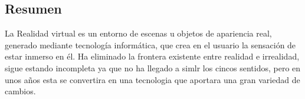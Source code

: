 \documentclass{bmcart}
\begin{document}
\begin{frontmatter}
\begin{abstractbox}

\begin{abstract} 

\end{abstract}



\section*{Resumen}
La Realidad virtual es un entorno de escenas u objetos de
apariencia real, generado mediante tecnología informática, que crea en el usuario la sensación de estar inmerso en él. Ha eliminado la frontera existente entre realidad e irrealidad, sigue estando incompleta ya que no ha llegado a simlr los cincos sentidos, pero en unos años esta se convertira en una tecnologia que aportara una gran variedad de cambios.
\end{abstractbox}
%

\end{frontmatter}

\end{document}
